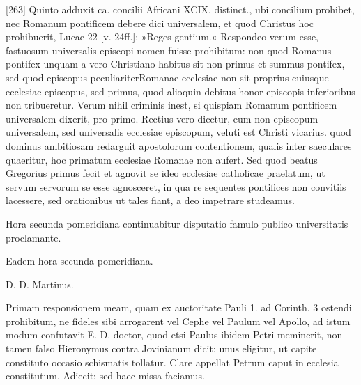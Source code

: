 [263] Quinto adduxit ca. concilii Africani XCIX. distinct., ubi concilium prohibet, nec Romanum pontificem debere dici universalem, et quod Christus hoc prohibuerit, Lucae 22 [v. 24ff.]: »Reges gentium.« Respondeo verum esse, fastuosum universalis episcopi nomen fuisse prohibitum: non quod Romanus pontifex unquam a vero Christiano habitus sit non primus et summus pontifex, sed quod episcopus peculiariterRomanae ecclesiae non sit proprius cuiusque ecclesiae episcopus, sed primus, quod alioquin debitus honor episcopis inferioribus non tribueretur. Verum nihil criminis inest, si quispiam Romanum pontificem universalem dixerit, pro primo. Rectius vero dicetur, eum non episcopum universalem, sed universalis ecclesiae episcopum, veluti est Christi vicarius. quod dominus ambitiosam redarguit apostolorum contentionem, qualis inter saeculares quaeritur, hoc primatum ecclesiae Romanae non aufert. Sed quod beatus Gregorius primus fecit et agnovit se ideo ecclesiae catholicae praelatum, ut servum servorum se esse agnosceret, in qua re sequentes pontifices non convitiis lacessere, sed orationibus ut tales fiant, a deo impetrare studeamus.

Hora secunda pomeridiana continuabitur disputatio famulo publico universitatis proclamante.

Eadem hora secunda pomeridiana.

D. D. Martinus.

Primam responsionem meam, quam ex auctoritate Pauli 1. ad Corinth. 3 ostendi prohibitum, ne fideles sibi arrogarent vel Cephe vel Paulum vel Apollo, ad istum modum confutavit E. D. doctor, quod etsi Paulus ibidem Petri meminerit, non tamen falso Hieronymus contra Jovinianum dicit: unus eligitur, ut capite constituto occasio schismatis tollatur. Clare appellat Petrum caput in ecclesia constitutum. Adiecit: sed haec missa faciamus.

